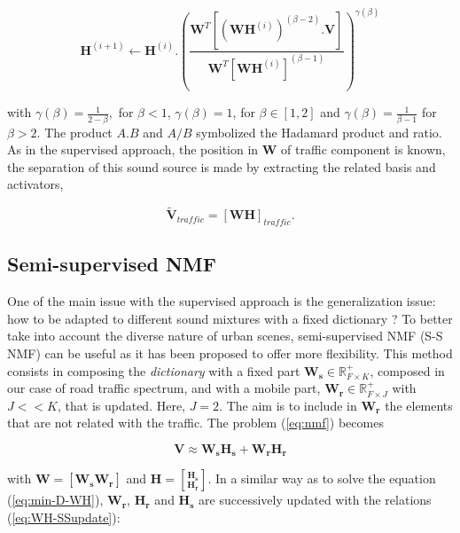 \documentclass[twocolumn,a4paper,10pt]{article}
\begin{document}
\begin{equation}\label{eq:updateH_Sup}
\textbf{H}^{(i+1)} \leftarrow \textbf{H}^{(i)}.\left(\frac{\textbf{W}^T \left[\left(\textbf{WH}^{(i)} \right)^{(\beta-2)}.\textbf{V} \right]}{\textbf{W}^T \left[\textbf{WH}^{(i)} \right]^{(\beta-1)}}\right)^{\gamma(\beta)}
\end{equation}

with $\gamma(\beta) = \frac{1}{2-\beta},$ for $\beta < 1$, $ \gamma(\beta) = 1$, for $\beta \in \left[1,2\right]$ and $\gamma(\beta) = \frac{1}{\beta-1}$ for $\beta > 2$. The product $A.B$ and $A/B$ symbolized the Hadamard product and ratio. As in the supervised approach, the position in $\mathbf{W}$ of traffic component is known, the separation of this sound source is made by extracting the related basis and activators,

\begin{equation}\label{eq:separationExtraction}
\mathbf{\tilde{V}}_{traffic} = \left[ \mathbf{WH} \right]_{traffic}.
\end{equation}

\subsection{Semi-supervised NMF}

One of the main issue with the supervised approach is the generalization issue: how to be adapted to different sound mixtures with a fixed dictionary ? To better take into account the diverse nature of urban scenes, semi-supervised NMF (S-S NMF)\cite{lee_semi-supervised_2010} can be useful as it has been proposed  to offer more flexibility. This method consists in composing the \textit{dictionary} with a fixed part $\mathbf{W_s} \in \mathbb{R}^+_{F\times K}$, composed in our case of road traffic spectrum, and with a mobile part, $\mathbf{W_r} \in \mathbb{R}^+_{F\times J}$ with $J <<K$, that is updated. Here, $J = 2$. The aim is to include in $\mathbf{W_r}$ the elements that are not related with the traffic. The problem (\ref{eq:nmf}) becomes

\begin{equation}
\mathbf{V} \approx \mathbf{W_s H_s}+ \mathbf{W_r H_r}
\end{equation}

 with $\mathbf{W} = \left[\mathbf{W_s} \mathbf{W_r} \right]$ and $\mathbf{H} = \genfrac[]{0pt}{0}{\mathbf{H_s}}{\mathbf{H_r}}$. In a similar way as to solve the equation (\ref{eq:min-D-WH}), $\mathbf{W_r}$, $\mathbf{H_r}$ and $\mathbf{H_s}$ are successively updated with the relations (\ref{eq:WH-SSupdate}):
\end{document}
